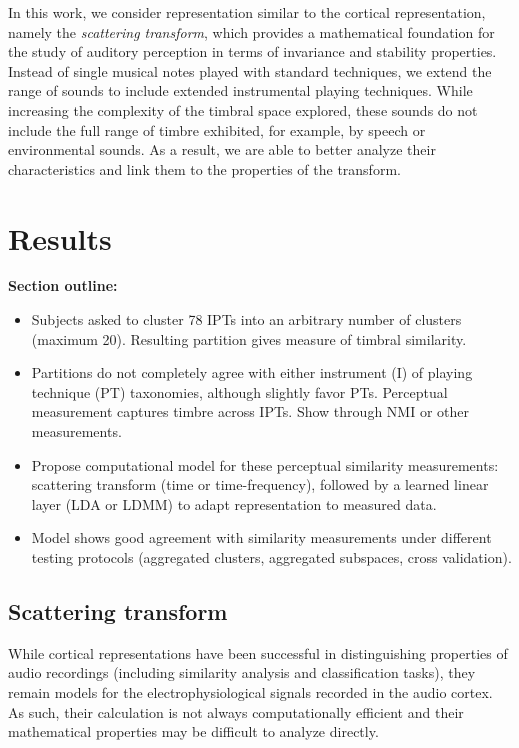 \documentclass{article}
\begin{document}
In this work, we consider representation similar to the cortical representation, namely the \emph{scattering transform}, which provides a mathematical foundation for the study of auditory perception in terms of invariance and stability properties.
Instead of single musical notes played with standard techniques, we extend the range of sounds to include extended instrumental playing techniques.
While increasing the complexity of the timbral space explored, these sounds do not include the full range of timbre exhibited, for example, by speech or environmental sounds.
As a result, we are able to better analyze their characteristics and link them to the properties of the transform.


\section{Results}
\label{sec:results}

\textbf{Section outline:}
\begin{itemize}
\item Subjects asked to cluster 78 IPTs into an arbitrary number of clusters (maximum 20). Resulting partition gives measure of timbral similarity.
\item Partitions do not completely agree with either instrument (I) of playing technique (PT) taxonomies, although slightly favor PTs. Perceptual measurement captures timbre across IPTs. Show through NMI or other measurements.
\item Propose computational model for these perceptual similarity measurements: scattering transform (time or time-frequency), followed by a learned linear layer (LDA or LDMM) to adapt representation to measured data.
\item Model shows good agreement with similarity measurements under different testing protocols (aggregated clusters, aggregated subspaces, cross validation).
\end{itemize}

\subsection{Scattering transform}
\label{sec:scattering}

While cortical representations have been successful in distinguishing properties of audio recordings (including similarity analysis and classification tasks), they remain models for the electrophysiological signals recorded in the audio cortex.
As such, their calculation is not always computationally efficient and their mathematical properties may be difficult to analyze directly.
\end{document}
